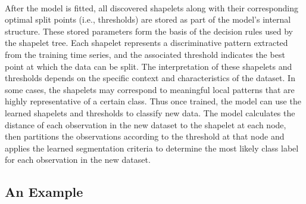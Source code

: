 \\
After the model is fitted, all discovered shapelets along with their corresponding optimal split points (i.e., thresholds) are stored as part of the model’s internal structure. These stored parameters form the basis of the decision rules used by the shapelet tree. Each shapelet represents a discriminative pattern extracted from the training time series, and the associated threshold indicates the best point at which the data can be split. The interpretation of these shapelets and thresholds depends on the specific context and characteristics of the dataset. In some cases, the shapelets may correspond to meaningful local patterns that are highly representative of a certain class. Thus once trained, the model can use the learned shapelets and thresholds to classify new data. The model calculates the distance of each observation in the new dataset to the shapelet at each node, then partitions the observations according to the threshold at that node and applies the learned segmentation criteria to determine the most likely class label for each observation in the new dataset.\\
\subsection{An Example}

